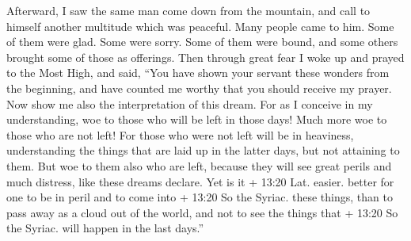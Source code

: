  Afterward, I saw the same man come down from the mountain,
and call to himself another multitude which was peaceful. 
Many people came to him. Some of them were glad. Some were sorry. Some
of them were bound, and some others brought some of those as offerings.
Then through great fear I woke up and prayed to the Most High, and said,
 ``You have shown your servant these wonders from the
beginning, and have counted me worthy that you should receive my prayer.
 Now show me also the interpretation of this dream.
 For as I conceive in my understanding, woe to those who
will be left in those days! Much more woe to those who are not left!
 For those who were not left will be in heaviness,
 understanding the things that are laid up in the latter
days, but not attaining to them.  But woe to them also who
are left, because they will see great perils and much distress, like
these dreams declare.  Yet is it + 13:20 Lat. easier.
better for one to be in peril and to come into + 13:20 So the Syriac.
these things, than to pass away as a cloud out of the world, and not to
see the things that + 13:20 So the Syriac. will happen in the last
days.''

